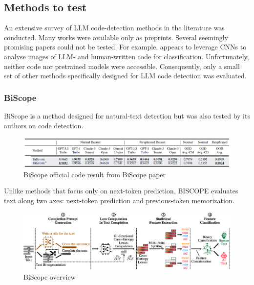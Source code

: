 \clearpage
\subsection{Methods to test}
An extensive survey of LLM code-detection methods 
in the literature was conducted. Many works were available 
only as preprints. Several seemingly promising papers could 
not be tested. For example, \cite{xu2025codevision} appears 
to leverage CNNs to analyse images of LLM- and human-written 
code for classification. Unfortunately, neither code nor 
pretrained models were accessible. Consequently, only a small 
set of other methods specifically designed for LLM code detection 
was evaluated.








\subsubsection{BiScope}
BiScope is a method designed for natural-text detection 
but was also tested by its authors on code detection.

\begin{figure}[H]
    \centering
    \includegraphics[width=1\textwidth]{img/BiScope/codetest.png}
    \caption{BiScope official code result from BiScope paper}
    \label{fig:BiScope official code result}
\end{figure}


Unlike methods that focus only on next-token prediction, 
BISCOPE evaluates text along two axes: next-token prediction 
and previous-token memorization.

\begin{figure}[H]
    \centering
    \includegraphics[width=1\textwidth]{img/BiScope/Overview.png}
    \caption{BiScope overview}
    \label{fig:BiScope-overview}
\end{figure}

